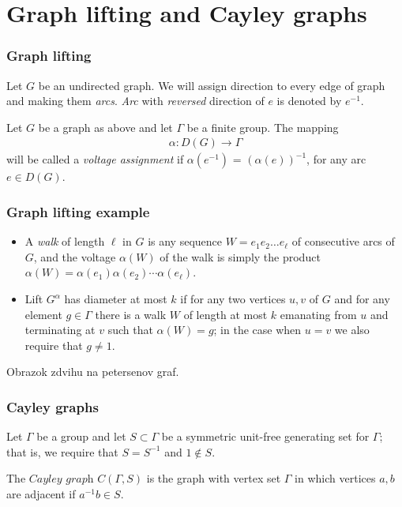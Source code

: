 \documentclass{beamer}
\begin{document}
\section{Graph lifting and Cayley graphs} 
\begin{frame}
	\frametitle{Graph lifting}
	Let $G$ be an undirected graph. We will assign direction to every edge of graph and making them {\em arcs}. {\em Arc} with {\em reversed} direction of $e$ is denoted by $e^{-1}$. 
	\begin{definition}
		Let $G$ be a graph as above and let $\Gamma$ be a finite group. The mapping
		\begin{align*}
			\alpha: D(G) \rightarrow \Gamma
		\end{align*}
		will be called a {\em voltage assignment} if $\alpha(e^{-1})$ = $(\alpha(e))^{-1}$, for any arc $e \in D(G)$.
	\end{definition}
\end{frame}
\begin{frame}
	\frametitle{Graph lifting example}
		\begin{itemize}
			\item A {\em walk} of length $\ell$ in $G$ is any sequence $W=e_1e_2\ldots e_{\ell}$ of consecutive arcs of $G$, and the voltage $\alpha(W)$ of the walk is simply the product $\alpha(W)=\alpha(e_1)\alpha(e_2)\cdots \alpha(e_{\ell})$. \\
			\item Lift $G^{\alpha}$ has diameter at most $k$ if for any two vertices $u,v$ of $G$ and for any element $g\in \Gamma$ there is a walk $W$ of length at most $k$ emanating from $u$ and terminating at $v$ such that $\alpha(W)=g$; in the case when $u=v$ we also require that $g\ne 1$.
		\end{itemize}
 					Obrazok zdvihu na petersenov graf.
\end{frame}
\begin{frame}
	\frametitle{Cayley graphs}
	Let $\Gamma$ be a group and let $S\subset \Gamma$ be a symmetric unit-free generating set for $\Gamma$; that is, we require that $S=S^{-1}$ and $1\notin S$. 
	\begin{definition}
		The $\textit{Cayley graph}$ $C(\Gamma,S)$ is the graph with vertex set $\Gamma$ in which vertices $a,b$ are adjacent if $a^{-1}b\in S$. 		
	\end{definition}
\end{frame}
\end{document}
